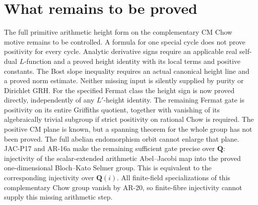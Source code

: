 \documentclass[11pt,a4paper]{article}
\begin{document}
\section{What remains to be proved}
The full primitive arithmetic height form on the complementary CM Chow
motive remains to be controlled. A formula for one special cycle does
not prove positivity for every cycle. Analytic derivative signs require
an applicable real self-dual $L$-function and a proved height identity
with its local terms and positive constants. The Bost slope inequality
requires an actual canonical height line and a proved norm estimate.
Neither missing input is silently supplied by purity or Dirichlet GRH.
For the specified Fermat class the height sign is now proved directly,
independently of any $L'$-height identity. The remaining Fermat gate is
positivity on its entire Griffiths quotient, together with vanishing
of its algebraically trivial subgroup if strict positivity on rational
Chow is required. The positive CM plane is known, but a spanning
theorem for the whole group has not been proved. The full abelian
endomorphism orbit cannot enlarge that plane. JAC-P17 and AR-16a
make the remaining sufficient gate precise over $\mathbf Q$: injectivity
of the scalar-extended arithmetic Abel--Jacobi map into the proved
one-dimensional Bloch--Kato Selmer group. This is equivalent to the
corresponding injectivity over $\mathbf Q(i)$. All finite-field
specializations of this complementary Chow group vanish by AR-20,
so finite-fibre injectivity cannot supply this missing arithmetic step.
\end{document}
